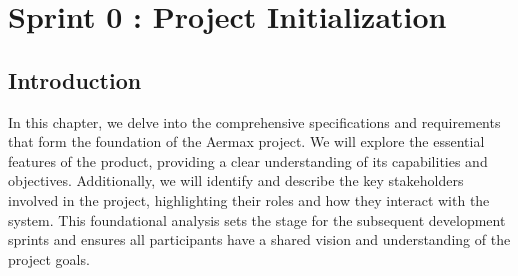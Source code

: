 \chapter{ Sprint 0 : Project Initialization}


\setcounter{secnumdepth}{0} %


\section{Introduction}
In this chapter, we delve into the comprehensive specifications and requirements that form the foundation of the Aermax project. We will explore the essential features of the product, providing a clear understanding of its capabilities and objectives. Additionally, we will identify and describe the key stakeholders involved in the project, highlighting their roles and how they interact with the system. This foundational analysis sets the stage for the subsequent development sprints and ensures all participants have a shared vision and understanding of the project goals.
\setcounter{secnumdepth}{3}
